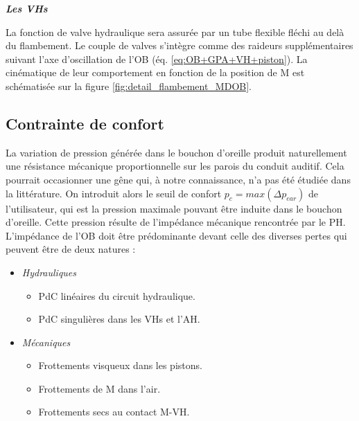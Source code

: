 \textbf{\textit{Les VHs}}

La fonction de valve hydraulique sera assurée par un tube flexible fléchi au delà du flambement. Le couple de valves s'intègre comme des raideurs supplémentaires suivant l'axe d'oscillation de l'OB (éq. \ref{eq:OB+GPA+VH+piston}). La cinématique de leur comportement en fonction de la position de M est schématisée sur la figure \ref{fig:detail_flambement_MDOB}.
		\subsection{Contrainte de confort}
		\label{subsec:2.5.2_Contrainte de confort}	
La variation de pression générée dans le bouchon d'oreille produit naturellement une résistance mécanique proportionnelle sur les parois du conduit auditif. Cela pourrait occasionner une gêne qui, à notre connaissance, n'a pas été étudiée dans la littérature. On introduit alors le seuil de confort \mbox{$p_c = max(\Delta p_{ear})$} de l'utilisateur, qui est la pression maximale pouvant être induite dans le bouchon d'oreille. Cette pression résulte de l'impédance mécanique rencontrée par le PH. L'impédance de l'OB doit être prédominante devant celle des diverses pertes qui peuvent être de deux natures :
\begin{itemize}[label=$\circ$]
\item \emph{Hydrauliques}
	\begin{itemize}
		\item PdC linéaires du circuit hydraulique.
		\item PdC singulières dans les VHs et l'AH.
	\end{itemize}
\item \emph{Mécaniques}
	\begin{itemize}
		\item Frottements visqueux dans les pistons.
		\item Frottements de M dans l'air.
		\item Frottements secs au contact M-VH.
	\end{itemize}
\end{itemize}

